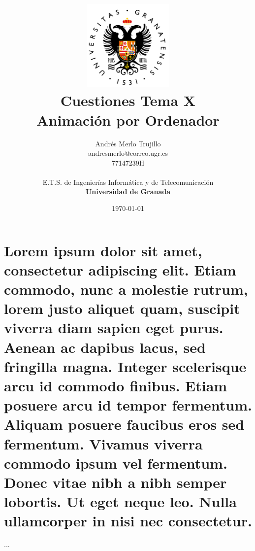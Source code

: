 \documentclass{article}
\title{
\includegraphics[width=1.75in]{imagenes/UGR-Logo.png} \\
\vspace*{1in}
\textbf{Cuestiones Tema X} \\
Animación por Ordenador \\
\vspace*{0.5in}}
\author{Andrés Merlo Trujillo \\
andresmerlo@correo.ugr.es \\
77147239H \\ 
\vspace*{0.5in} \\
E.T.S. de Ingenierías Informática y de Telecomunicación \\
\textbf{Universidad de Granada}} \date{\today}
\begin{document}
\begin{titlingpage}
\maketitle
\end{titlingpage}

\tableofcontents

\newpage

\pagestyle{fancy}   %


\section{Lorem ipsum dolor sit amet, consectetur adipiscing elit. Etiam commodo, nunc a molestie rutrum, lorem justo aliquet quam, suscipit viverra diam sapien eget purus. Aenean ac dapibus lacus, sed fringilla magna. Integer scelerisque arcu id commodo finibus. Etiam posuere arcu id tempor fermentum. Aliquam posuere faucibus eros sed fermentum. Vivamus viverra commodo ipsum vel fermentum. Donec vitae nibh a nibh semper lobortis. Ut eget neque leo. Nulla ullamcorper in nisi nec consectetur. }

...
\end{document}
